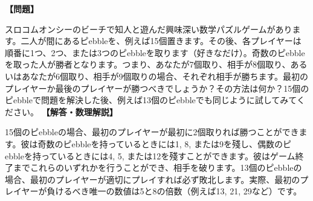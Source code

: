 \documentclass[10pt,a4paper,oneside,openany]{ltjsbook}
\begin{document}
\begin{tcolorbox}[colback=softblue,colframe=primaryblue,title=\textbf{第 392 問：Pebble Game（ Pebble ゲーム） （原題: THE PEBBLE GAME.）},arc=2mm,boxrule=1pt,breakable]
\textbf{【問題】}\par\vspace{0.3em}
スロコムオンシーのビーチで知人と遊んだ興味深い数学パズルゲームがあります。二人が間にあるピebbleを、例えば15個置きます。その後、各プレイヤーは順番に1つ、2つ、または3つのピebbleを取ります（好きなだけ）。奇数のピebbleを取った人が勝者となります。つまり、あなたが7個取り、相手が8個取り、あるいはあなたが6個取り、相手が9個取りの場合、それぞれ相手が勝ちます。最初のプレイヤーか最後のプレイヤーが勝つべきでしょうか？その方法は何か？15個のピebbleで問題を解決した後、例えば13個のピebbleでも同じように試してみてください。
\tcblower
\textbf{【解答・数理解説】}\par\vspace{0.3em}
15個のピebbleの場合、最初のプレイヤーが最初に2個取りれば勝つことができます。彼は奇数のピebbleを持っているときには1, 8, または9を殘し、偶数のピebbleを持っているときには4, 5, または12を殘すことができます。彼はゲーム終了までこれらのいずれかを行うことができ、相手を破ります。13個のピebbleの場合、最初のプレイヤーが適切にプレイすれば必ず敗北します。実際、最初のプレイヤーが負けるべき唯一の数値は5と8の倍数（例えば13, 21, 29など）です。
\end{tcolorbox}
\end{document}

